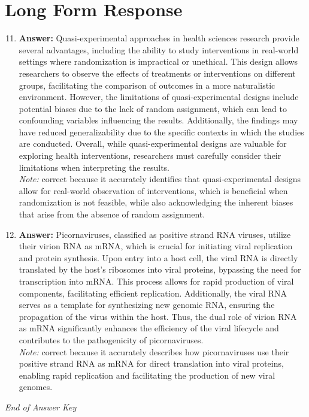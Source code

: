 \documentclass[12pt]{article}
\begin{document}
\section*{Long Form Response}
\begin{enumerate}[label=\arabic*.]
\setcounter{enumi}{10}
\item \textbf{Answer:} Quasi-experimental approaches in health sciences research provide several advantages, including the ability to study interventions in real-world settings where randomization is impractical or unethical. This design allows researchers to observe the effects of treatments or interventions on different groups, facilitating the comparison of outcomes in a more naturalistic environment. However, the limitations of quasi-experimental designs include potential biases due to the lack of random assignment, which can lead to confounding variables influencing the results. Additionally, the findings may have reduced generalizability due to the specific contexts in which the studies are conducted. Overall, while quasi-experimental designs are valuable for exploring health interventions, researchers must carefully consider their limitations when interpreting the results.
\\ \textit{Note:} correct because it accurately identifies that quasi-experimental designs allow for real-world observation of interventions, which is beneficial when randomization is not feasible, while also acknowledging the inherent biases that arise from the absence of random assignment.
\item \textbf{Answer:} Picornaviruses, classified as positive strand RNA viruses, utilize their virion RNA as mRNA, which is crucial for initiating viral replication and protein synthesis. Upon entry into a host cell, the viral RNA is directly translated by the host's ribosomes into viral proteins, bypassing the need for transcription into mRNA. This process allows for rapid production of viral components, facilitating efficient replication. Additionally, the viral RNA serves as a template for synthesizing new genomic RNA, ensuring the propagation of the virus within the host. Thus, the dual role of virion RNA as mRNA significantly enhances the efficiency of the viral lifecycle and contributes to the pathogenicity of picornaviruses.
\\ \textit{Note:} correct because it accurately describes how picornaviruses use their positive strand RNA as mRNA for direct translation into viral proteins, enabling rapid replication and facilitating the production of new viral genomes.
\end{enumerate}

\vfill
\noindent\textit{End of Answer Key}
\end{document}
